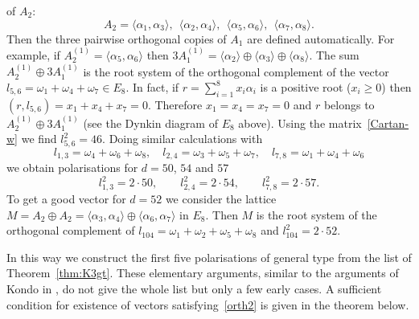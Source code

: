\documentclass[a4paper,11pt]{article}
\newcommand{\latt}[1]{{\langle{#1}\rangle}}
\begin{document}
of $A_2$:
\begin{equation*}
A_2=\latt{\alpha_1, \alpha_3},\ \
\latt{\alpha_2, \alpha_4},\ \
\latt{\alpha_5, \alpha_6},\ \
\latt{\alpha_7, \alpha_8}.
\end{equation*}
Then the three pairwise orthogonal copies of $A_1$ are defined
automatically.  For example, if $A_2^{(1)}=\latt{\alpha_5, \alpha_6}$
then $3A_1^{(1)}=\latt{\alpha_2}\oplus \latt{\alpha_3}\oplus
\latt{\alpha_8}$.  The sum $A_2^{(1)}\oplus 3A_1^{(1)}$ is the root
system of the orthogonal complement of the vector
$l_{5,6}=\omega_1+\omega_4+\omega_7\in E_8$.  In fact, if
$r=\sum_{i=1}^8 x_i \alpha_i$ is a positive root ($x_i\ge 0$) then
$(r,l_{5,6})=x_1+x_4+x_7=0$. Therefore $x_1=x_4=x_7=0$ and $r$ belongs
to $A_2^{(1)}\oplus 3A_1^{(1)}$ (see the Dynkin diagram of $E_8$
above). Using the matrix~\eqref{Cartan-w} we find $l_{5,6}^2=46$.
Doing similar calculations with
\begin{equation*}
l_{1,3}=\omega_4+\omega_6+\omega_8,\quad
l_{2,4}=\omega_3+\omega_5+\omega_7,\quad
l_{7,8}=\omega_1+\omega_4+\omega_6
\end{equation*}
we obtain polarisations for $d=50$, $54$ and $57$
\begin{equation*}
l_{1,3}^2=2\cdot 50, \qquad l_{2,4}^2=2\cdot 54, \qquad l_{7,8}^2=2\cdot 57.
\end{equation*}
To get a good vector for $d=52$ we consider the lattice $M=A_2\oplus
A_2=\latt{\alpha_3, \alpha_4}\oplus \latt{\alpha_6, \alpha_7}$ in
$E_8$. Then $M$ is the root system of the orthogonal complement of
$l_{104}=\omega_1+\omega_2+\omega_5+\omega_8$ and $l_{104}^2=2\cdot
52$.

In this way we construct the first five polarisations of general
type from the list of Theorem~\ref{thm:K3gt}.  These elementary
arguments, similar to the arguments of Kondo in \cite{Ko2}, do not
give the whole list but only a few early cases.  A sufficient
condition for existence of vectors satisfying~\eqref{orth2} is
given in the theorem below.
\end{document}
